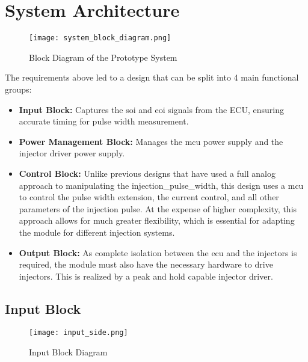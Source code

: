     \section{System Architecture}

    

        \begin{figure}[H]
            \centering
            \texttt{[image: system\_block\_diagram.png]}
            \caption{Block Diagram of the Prototype System}
            \label{fig:block_diagram}
        \end{figure}

        The requirements above led to a design that can be split into 4 main functional groups:

        \begin{itemize}
            \item \textbf{Input Block:} Captures the \gls{soi} and \gls{eoi} signals from the ECU, ensuring accurate timing for pulse width measurement.
            \item \textbf{Power Management Block:} Manages the \gls{mcu} power supply and the injector driver power supply.
            \item \textbf{Control Block:} Unlike previous designs that have used a full analog approach to manipulating the \gls{injection_pulse_width}, this design uses a \gls{mcu} to control the pulse width extension, the current control, and all other parameters of the injection pulse. At the expense of higher complexity, this approach allows for much greater flexibility, which is essential for adapting the module for different injection systems.
            \item \textbf{Output Block:} As complete isolation between the \gls{ecu} and the injectors is required, the module must also have the necessary hardware to drive injectors. This is realized by a peak and hold capable injector driver.
        \end{itemize}

        \subsection{Input Block}
            

            \begin{figure}[H]
                \centering
                \texttt{[image: input\_side.png]}
                \caption{Input Block Diagram}
                \label{fig:input_block_diagram}
            \end{figure}

